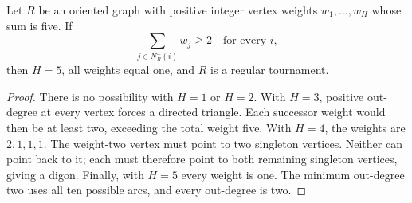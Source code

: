 \begin{lemma}
Let $R$ be an oriented graph with positive integer vertex weights
$w_1,\ldots,w_H$ whose sum is five. If
\[
 \sum_{j\in N_R^+(i)}w_j\ge2\quad\text{for every }i,
\]
then $H=5$, all weights equal one, and $R$ is a regular tournament.
\end{lemma}
\begin{proof}
There is no possibility with $H=1$ or $H=2$. With $H=3$, positive
out-degree at every vertex forces a directed triangle. Each
successor weight would then be at least two, exceeding the total
weight five. With $H=4$, the weights are $2,1,1,1$. The weight-two
vertex must point to two singleton vertices. Neither can point
back to it; each must therefore point to both remaining singleton
vertices, giving a digon. Finally, with $H=5$ every weight is one.
The minimum out-degree two uses all ten possible arcs, and every
out-degree is two.
\end{proof}

